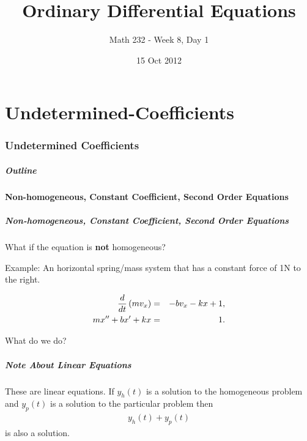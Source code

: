 \part{Undetermined-Coefficients}
\section{Undetermined Coefficients}

\title{Ordinary Differential Equations}
\subtitle{Math 232 - Week 8, Day 1}
\date{15 Oct 2012}

\begin{frame}
  \titlepage
\end{frame}

\begin{frame}
  \frametitle{Outline}
\end{frame}


\subsection{Non-homogeneous, Constant Coefficient, Second Order Equations}


\begin{frame}
  \frametitle{Non-homogeneous, Constant Coefficient, Second Order
    Equations}
  What if the equation is \textbf{not} homogeneous?

  Example: An horizontal spring/mass system that has a constant force
  of 1N to the right.

  \begin{eqnarray*}
    \frac{d}{dt} \left( m v_x \right) & = & -b v_x - kx + 1, \\
    m x'' + bx' + kx & = & 1.
  \end{eqnarray*}

  What do we do?


\end{frame}


\begin{frame}
  \frametitle{Note About Linear Equations}

  These are linear equations. If $y_h(t)$ is a solution to the
  homogeneous problem and $y_p(t)$ is a solution to the particular
  problem then
  \begin{eqnarray*}
    y_h(t) + y_p(t)
  \end{eqnarray*}
  is also a solution.

\end{frame}


